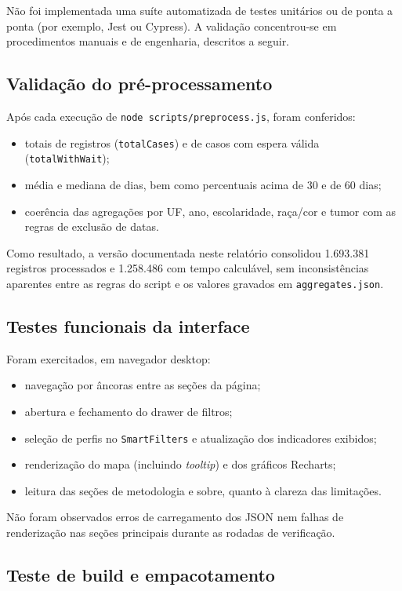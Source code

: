 Não foi implementada uma suíte automatizada de testes unitários ou de ponta a ponta (por exemplo, Jest ou Cypress). A validação concentrou-se em procedimentos manuais e de engenharia, descritos a seguir.

\subsection{Validação do pré-processamento}

Após cada execução de \texttt{node scripts/preprocess.js}, foram conferidos:
\begin{itemize}
	\item totais de registros (\texttt{totalCases}) e de casos com espera válida (\texttt{totalWithWait});
	\item média e mediana de dias, bem como percentuais acima de 30 e de 60 dias;
	\item coerência das agregações por UF, ano, escolaridade, raça/cor e tumor com as regras de exclusão de datas.
\end{itemize}
Como resultado, a versão documentada neste relatório consolidou 1.693.381 registros processados e 1.258.486 com tempo calculável, sem inconsistências aparentes entre as regras do script e os valores gravados em \texttt{aggregates.json}.

\subsection{Testes funcionais da interface}

Foram exercitados, em navegador desktop:
\begin{itemize}
	\item navegação por âncoras entre as seções da página;
	\item abertura e fechamento do drawer de filtros;
	\item seleção de perfis no \texttt{SmartFilters} e atualização dos indicadores exibidos;
	\item renderização do mapa (incluindo \textit{tooltip}) e dos gráficos Recharts;
	\item leitura das seções de metodologia e sobre, quanto à clareza das limitações.
\end{itemize}
Não foram observados erros de carregamento dos \acs{JSON} nem falhas de renderização nas seções principais durante as rodadas de verificação.

\subsection{Teste de build e empacotamento}

